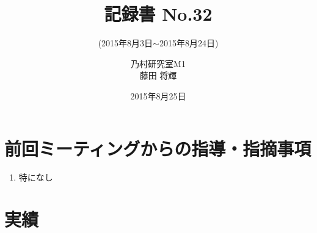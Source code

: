 \documentclass[fleqn, 14pt]{extarticle}
\subtitle{(2015年8月3日$\sim$2015年8月24日)}
\author{乃村研究室M1\\藤田 将輝}
\date{2015年8月25日}
\title{記録書 No.32}
\begin{document}
    \maketitle

    \section{前回ミーティングからの指導・指摘事項}
    \label{sec-1}
    \begin{enumerate}
        \item 特になし
            \newline
            \hfill

    \end{enumerate}

    \section{実績}
    \label{sec-2}
\end{document}
